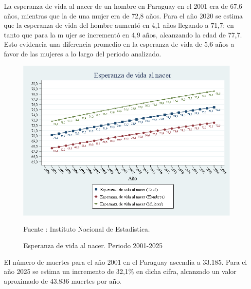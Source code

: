 La esperanza de vida al nacer de un hombre en Paraguay en el 2001 era de
67,6 años, mientras que la de una mujer era de 72,8 años. Para el año
2020 se estima que la esperanza de vida del hombre aumentó en 4,1 años
llegando a 71,7; en tanto que para la m ujer se incrementó en 4,9 años,
alcanzando la edad de 77,7. Esto evidencia una diferencia promedio en la
esperanza de vida de 5,6 años a favor de las mujeres a lo largo del
periodo analizado.

\begin{figure}[H]
\begin{center}
                    \caption{Esperanza de vida al nacer. Periodo 2001-2025}
                    \includegraphics[scale=0.45]{INE_indic_ev0.png}
                                    \item \footnotesize Fuente : Instituto Nacional de Estadística.
                    \end{center}
\end{figure}

El número de muertes para el año 2001 en el Paraguay ascendía a 33.185.
Para el año 2025 se estima un incremento de 32,1\% en dicha cifra,
alcanzado un valor aproximado de 43.836 muertes por año.

